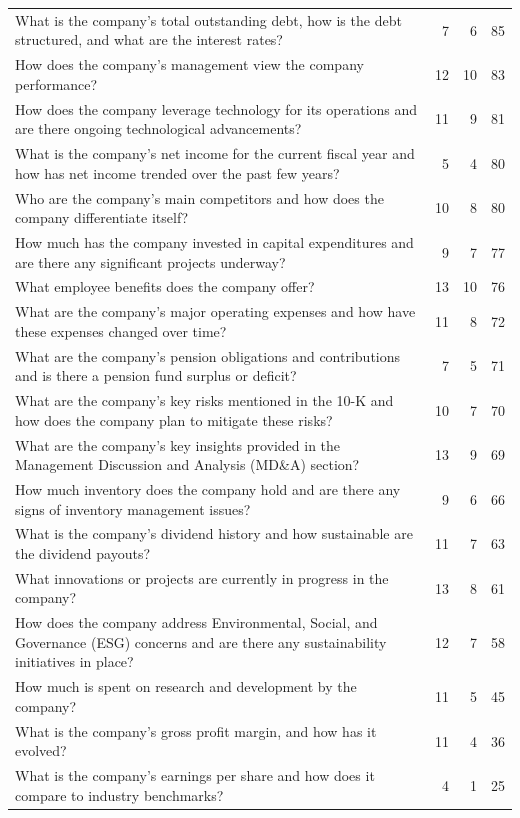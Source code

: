 \begin{longtable}{L{0.6\textwidth}rrr}
What is the company's total outstanding debt, how is the debt structured, and what are the interest rates? & 7 & 6 & 85 \\
How does the company's management view the company performance? & 12 & 10 & 83 \\
How does the company leverage technology for its operations and are there ongoing technological advancements? & 11 & 9 & 81 \\
What is the company's net income for the current fiscal year and how has net income trended over the past few years? & 5 & 4 & 80 \\
Who are the company's main competitors and how does the company differentiate itself? & 10 & 8 & 80 \\
How much has the company invested in capital expenditures and are there any significant projects underway? & 9 & 7 & 77 \\
What employee benefits does the company offer? & 13 & 10 & 76 \\
What are the company's major operating expenses and how have these expenses changed over time? & 11 & 8 & 72 \\
What are the company's pension obligations and contributions and is there a pension fund surplus or deficit? & 7 & 5 & 71 \\
What are the company's key risks mentioned in the 10-K and how does the company plan to mitigate these risks? & 10 & 7 & 70 \\
What are the company's key insights provided in the Management Discussion and Analysis (MD\&A) section? & 13 & 9 & 69 \\
How much inventory does the company hold and are there any signs of inventory management issues? & 9 & 6 & 66 \\
What is the company's dividend history and how sustainable are the dividend payouts? & 11 & 7 & 63 \\
What innovations or projects are currently in progress in the company? & 13 & 8 & 61 \\
How does the company address Environmental, Social, and Governance (ESG) concerns and are there any sustainability initiatives in place? & 12 & 7 & 58 \\
How much is spent on research and development by the company? & 11 & 5 & 45 \\
What is the company's gross profit margin, and how has it evolved? & 11 & 4 & 36 \\
What is the company's earnings per share and how does it compare to industry benchmarks? & 4 & 1 & 25 \\

\end{longtable}
